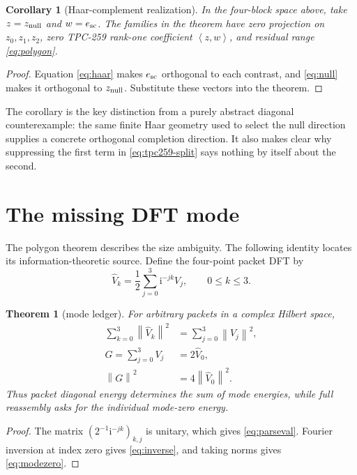 \documentclass[11pt]{article}
\newtheorem{theorem}{Theorem}
\newtheorem{corollary}{Corollary}
\theoremstyle{definition}
\newcommand{\norm}[1]{\left\lVert #1\right\rVert}
\newcommand{\ip}[2]{\left\langle #1,#2\right\rangle}
\newcommand{\Vhat}{\widehat V}
\newcommand{\ii}{\mathrm i}
\begin{document}
\begin{corollary}[Haar-complement realization]
In the four-block space above, take $z=z_{\rm null}$ and $w=e_{\rm sc}$.  The
families in the theorem have zero projection on $z_0,z_1,z_2$, zero TPC-259
rank-one coefficient $\ip{z}{w}$, and residual range \eqref{eq:polygon}.
\end{corollary}

\begin{proof}
Equation \eqref{eq:haar} makes $e_{\rm sc}$ orthogonal to each contrast, and
\eqref{eq:null} makes it orthogonal to $z_{\rm null}$.  Substitute these vectors
into the theorem.
\end{proof}

The corollary is the key distinction from a purely abstract diagonal counterexample:
the same finite Haar geometry used to select the null direction supplies a concrete
orthogonal completion direction.  It also makes clear why suppressing the first
term in \eqref{eq:tpc259-split} says nothing by itself about the second.

\section{The missing DFT mode}

The polygon theorem describes the size ambiguity.  The following identity locates
its information-theoretic source.  Define the four-point packet DFT by
\begin{equation}
 \Vhat_k=\frac12\sum_{j=0}^3\ii^{-jk}V_j,
 \qquad 0\leq k\leq3.
 \label{eq:dft}
\end{equation}

\begin{theorem}[mode ledger]
For arbitrary packets in a complex Hilbert space,
\begin{align}
 \sum_{k=0}^3\norm{\Vhat_k}^2&=\sum_{j=0}^3\norm{V_j}^2, \label{eq:parseval}\\
 G=\sum_{j=0}^3V_j&=2\Vhat_0, \label{eq:inverse}\\
 \norm{G}^2&=4\norm{\Vhat_0}^2. \label{eq:modezero}
\end{align}
Thus packet diagonal energy determines the sum of mode energies, while full
reassembly asks for the individual mode-zero energy.
\end{theorem}

\begin{proof}
The matrix $(2^{-1}\ii^{-jk})_{k,j}$ is unitary, which gives
\eqref{eq:parseval}.  Fourier inversion at index zero gives \eqref{eq:inverse},
and taking norms gives \eqref{eq:modezero}.
\end{proof}
\end{document}
